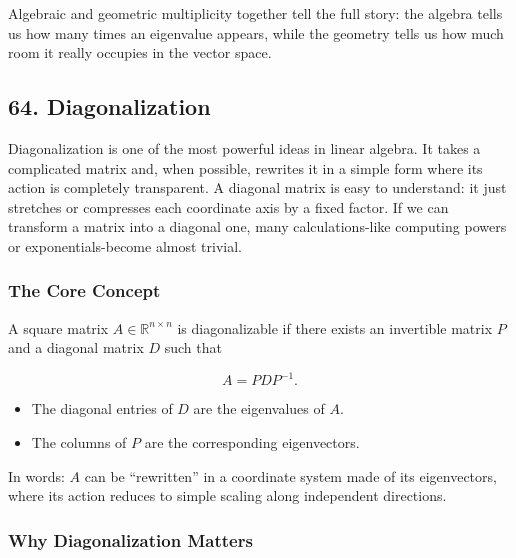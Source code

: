 \documentclass[
  letterpaper,
  DIV=11,
  numbers=noendperiod]{scrreprt}
\providecommand{\tightlist}{%
  \setlength{\itemsep}{0pt}\setlength{\parskip}{0pt}}
\begin{document}
Algebraic and geometric multiplicity together tell the full story: the
algebra tells us how many times an eigenvalue appears, while the
geometry tells us how much room it really occupies in the vector space.

\subsection{64. Diagonalization}\label{diagonalization}

Diagonalization is one of the most powerful ideas in linear algebra. It
takes a complicated matrix and, when possible, rewrites it in a simple
form where its action is completely transparent. A diagonal matrix is
easy to understand: it just stretches or compresses each coordinate axis
by a fixed factor. If we can transform a matrix into a diagonal one,
many calculations-like computing powers or exponentials-become almost
trivial.

\subsubsection{The Core Concept}\label{the-core-concept}

A square matrix \(A \in \mathbb{R}^{n \times n}\) is diagonalizable if
there exists an invertible matrix \(P\) and a diagonal matrix \(D\) such
that

\[
A = P D P^{-1}.
\]

\begin{itemize}
\tightlist
\item
  The diagonal entries of \(D\) are the eigenvalues of \(A\).
\item
  The columns of \(P\) are the corresponding eigenvectors.
\end{itemize}

In words: \(A\) can be ``rewritten'' in a coordinate system made of its
eigenvectors, where its action reduces to simple scaling along
independent directions.

\subsubsection{Why Diagonalization
Matters}\label{why-diagonalization-matters}
\end{document}
